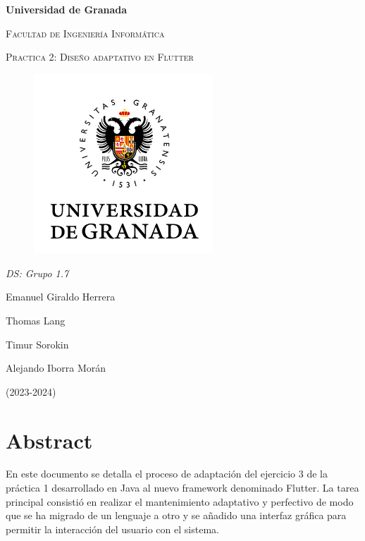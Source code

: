 \documentclass{article}
\begin{document}
    \begin{titlepage}
        \centering
        {\bfseries\LARGE Universidad de Granada\par}
        \vspace{1cm}
        {\scshape\Large Facultad de Ingeniería Informática \par}
        \vspace{2cm}
        {\scshape\Huge Practica 2: Diseño adaptativo en Flutter \par}
        \begin{figure}[h]
                \centering
                \includegraphics[width=0.6\textwidth]{logo_UGR.jpg}
                \label{fig:portada}
            \end{figure}
        {\itshape\Large DS: Grupo 1.7\par}
        \vfill
            {\Large  Emanuel Giraldo Herrera\par}
            {\Large  Thomas Lang \par}
            {\Large  Timur Sorokin \par}
            {\Large  Alejando Iborra Morán \par}
        \vfill
        {\Large (2023-2024) \par}
    \end{titlepage}

\tableofcontents

\newpage
\section{Abstract}

En este documento se detalla el proceso de adaptación del ejercicio 3 de la práctica 1 desarrollado en Java al nuevo framework denominado Flutter.
La tarea principal consistió en realizar el mantenimiento adaptativo y perfectivo de modo que se ha migrado de un lenguaje a otro y se añadido una interfaz gráfica para 
permitir la interacción del usuario con el sistema.
\end{document}
